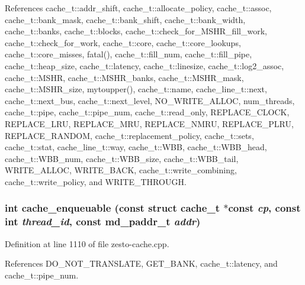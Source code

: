 References cache\_\-t::addr\_\-shift, cache\_\-t::allocate\_\-policy, cache\_\-t::assoc, cache\_\-t::bank\_\-mask, cache\_\-t::bank\_\-shift, cache\_\-t::bank\_\-width, cache\_\-t::banks, cache\_\-t::blocks, cache\_\-t::check\_\-for\_\-MSHR\_\-fill\_\-work, cache\_\-t::check\_\-for\_\-work, cache\_\-t::core, cache\_\-t::core\_\-lookups, cache\_\-t::core\_\-misses, fatal(), cache\_\-t::fill\_\-num, cache\_\-t::fill\_\-pipe, cache\_\-t::heap\_\-size, cache\_\-t::latency, cache\_\-t::linesize, cache\_\-t::log2\_\-assoc, cache\_\-t::MSHR, cache\_\-t::MSHR\_\-banks, cache\_\-t::MSHR\_\-mask, cache\_\-t::MSHR\_\-size, mytoupper(), cache\_\-t::name, cache\_\-line\_\-t::next, cache\_\-t::next\_\-bus, cache\_\-t::next\_\-level, NO\_\-WRITE\_\-ALLOC, num\_\-threads, cache\_\-t::pipe, cache\_\-t::pipe\_\-num, cache\_\-t::read\_\-only, REPLACE\_\-CLOCK, REPLACE\_\-LRU, REPLACE\_\-MRU, REPLACE\_\-NMRU, REPLACE\_\-PLRU, REPLACE\_\-RANDOM, cache\_\-t::replacement\_\-policy, cache\_\-t::sets, cache\_\-t::stat, cache\_\-line\_\-t::way, cache\_\-t::WBB, cache\_\-t::WBB\_\-head, cache\_\-t::WBB\_\-num, cache\_\-t::WBB\_\-size, cache\_\-t::WBB\_\-tail, WRITE\_\-ALLOC, WRITE\_\-BACK, cache\_\-t::write\_\-combining, cache\_\-t::write\_\-policy, and WRITE\_\-THROUGH.
\subsubsection[{cache\_\-enqueuable}]{\setlength{\rightskip}{0pt plus 5cm}int cache\_\-enqueuable (const struct {\bf cache\_\-t} $\ast$const  {\em cp}, \/  const int {\em thread\_\-id}, \/  const {\bf md\_\-paddr\_\-t} {\em addr})}\label{zesto-cache_8cpp_35c7c82c117f5713ec55d40f831060da}




Definition at line 1110 of file zesto-cache.cpp.

References DO\_\-NOT\_\-TRANSLATE, GET\_\-BANK, cache\_\-t::latency, and cache\_\-t::pipe\_\-num.
